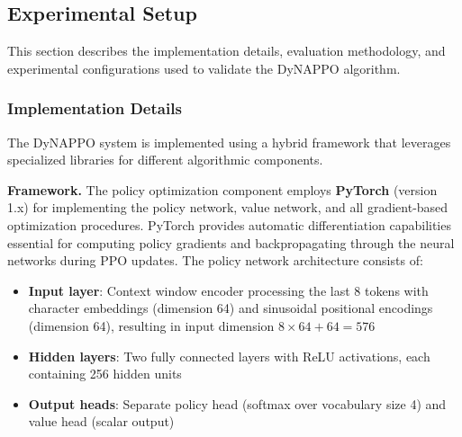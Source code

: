 \subsection{Experimental Setup}

This section describes the implementation details, evaluation methodology, and experimental configurations used to validate the DyNAPPO algorithm.

\subsubsection{Implementation Details}

The DyNAPPO system is implemented using a hybrid framework that leverages specialized libraries for different algorithmic components.

\textbf{Framework.} The policy optimization component employs \textbf{PyTorch} (version 1.x) for implementing the policy network, value network, and all gradient-based optimization procedures. PyTorch provides automatic differentiation capabilities essential for computing policy gradients and backpropagating through the neural networks during PPO updates. The policy network architecture consists of:
\begin{itemize}
    \item \textbf{Input layer}: Context window encoder processing the last 8 tokens with character embeddings (dimension 64) and sinusoidal positional encodings (dimension 64), resulting in input dimension $8 \times 64 + 64 = 576$
    \item \textbf{Hidden layers}: Two fully connected layers with ReLU activations, each containing 256 hidden units
    \item \textbf{Output heads}: Separate policy head (softmax over vocabulary size 4) and value head (scalar output)
\end{itemize}

